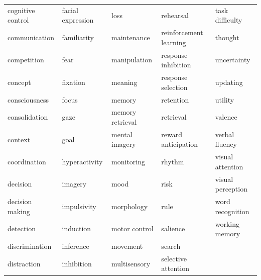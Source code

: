\documentclass[12pt,aps,pra,reprint,showkeys]{revtex4-1}
\begin{document}
\begin{table}[htp]
\begin{center}
\begin{tabular}{l l l l l}
        cognitive control       & facial expression  & loss                   & rehearsal              & task difficulty        \\
        communication           & familiarity        & maintenance            & reinforcement learning & thought                \\
        competition             & fear               & manipulation           & response inhibition    & uncertainty            \\
        concept                 & fixation           & meaning                & response selection     & updating               \\
        consciousness           & focus              & memory                 & retention              & utility                \\
        consolidation           & gaze               & memory retrieval       & retrieval              & valence                \\
        context                 & goal               & mental imagery         & reward anticipation    & verbal fluency         \\
        coordination            & hyperactivity      & monitoring             & rhythm                 & visual attention       \\
        decision                & imagery            & mood                   & risk                   & visual perception      \\
        decision making         & impulsivity        & morphology             & rule                   & word recognition       \\
        detection               & induction          & motor control          & salience               & working memory         \\
        discrimination          & inference          & movement               & search                 &                        \\
        distraction             & inhibition         & multisensory           & selective attention    &                        \\
      \end{tabular}
    \end{center}
\end{table}
\end{document}
